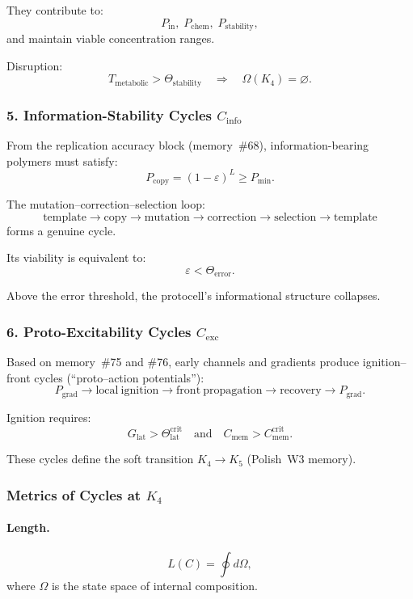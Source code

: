 They contribute to:
\[
  P_{\mathrm{in}},\; P_{\mathrm{chem}},\; P_{\mathrm{stability}},
\]
and maintain viable concentration ranges.

Disruption:
\[
  T_{\mathrm{metabolic}}>\Theta_{\mathrm{stability}}
\quad\Rightarrow\quad
  \Omega(K_4)=\varnothing.
\]

\subsubsection{5. Information-Stability Cycles $C_{\mathrm{info}}$}

From the replication accuracy block (memory~\#68),
information-bearing polymers must satisfy:
\[
  P_{\mathrm{copy}}=(1-\varepsilon)^L \ge P_{\min}.
\]

The mutation–correction–selection loop:
\[
  \mathrm{template}
  \to \mathrm{copy}
  \to \mathrm{mutation}
  \to \mathrm{correction}
  \to \mathrm{selection}
  \to \mathrm{template}
\]
forms a genuine cycle.

Its viability is equivalent to:
\[
  \varepsilon < \Theta_{\mathrm{error}}.
\]

Above the error threshold, the protocell’s informational structure
collapses.

\subsubsection{6. Proto-Excitability Cycles $C_{\mathrm{exc}}$}

Based on memory~\#75 and \#76, early channels and gradients produce
ignition–front cycles (“proto–action potentials”):
\[
  P_{\mathrm{grad}} \to
  \mathrm{local\ ignition} \to
  \mathrm{front\ propagation} \to
  \mathrm{recovery} \to
  P_{\mathrm{grad}}.
\]

Ignition requires:
\[
  G_{\mathrm{lat}} > \Theta^{\mathrm{crit}}_{\mathrm{lat}}
\quad\text{and}\quad
  C_{\mathrm{mem}}>C_{\mathrm{mem}}^{\mathrm{crit}}.
\]

These cycles define the soft transition $K_4\to K_5$ 
(Polish~W3 memory).

\subsubsection{Metrics of Cycles at \texorpdfstring{$K_4$}{K_4}}

\paragraph{Length.}
\[
  L(C)=\oint d\Omega,
\]
where $\Omega$ is the state space of internal composition.

